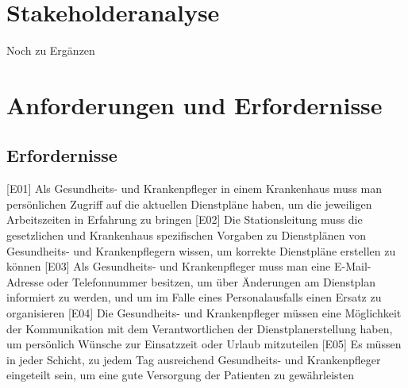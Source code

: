 \documentclass[10pt,a4paper]{article}
\begin{document}
\section{Stakeholderanalyse}
Noch zu Ergänzen
\section{Anforderungen und Erfordernisse}
\subsection{Erfordernisse}
[E01] Als Gesundheits- und Krankenpfleger in einem Krankenhaus muss man persönlichen Zugriff auf die aktuellen Dienstpläne haben, um die jeweiligen Arbeitszeiten in Erfahrung zu bringen
[E02] Die Stationsleitung muss die gesetzlichen und Krankenhaus spezifischen Vorgaben zu Dienstplänen von Gesundheits- und Krankenpflegern wissen, um korrekte Dienstpläne erstellen zu können
[E03] Als Gesundheits- und Krankenpfleger muss man eine E-Mail-Adresse oder Telefonnummer besitzen, um über Änderungen am Dienstplan informiert zu werden, und um im Falle eines Personalausfalls einen Ersatz zu organisieren
[E04] Die Gesundheits- und Krankenpfleger müssen eine Möglichkeit der Kommunikation mit dem Verantwortlichen der Dienstplanerstellung haben, um persönlich Wünsche zur Einsatzzeit oder Urlaub mitzuteilen
[E05] Es müssen in jeder Schicht, zu jedem Tag ausreichend Gesundheits- und Krankenpfleger eingeteilt sein, um eine gute Versorgung der Patienten zu gewährleisten
\end{document}
